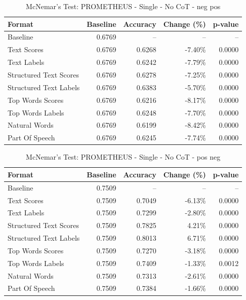\begin{table}[htbp]
\centering
\caption{McNemar's Test: PROMETHEUS - Single - No CoT - neg pos}
\label{tab:prometheus-single-no_chain_of_thought-neg_pos}
\begin{tabular}{lrrrr}
\toprule
Format & Baseline & Accuracy & Change (\%) & p-value \\
\midrule
Baseline & 0.6769 & -- & -- & -- \\
Text Scores & 0.6769 & 0.6268 & -7.40\% & 0.0000 \\
Text Labels & 0.6769 & 0.6242 & -7.79\% & 0.0000 \\
Structured Text Scores & 0.6769 & 0.6278 & -7.25\% & 0.0000 \\
Structured Text Labels & 0.6769 & 0.6383 & -5.70\% & 0.0000 \\
Top Words Scores & 0.6769 & 0.6216 & -8.17\% & 0.0000 \\
Top Words Labels & 0.6769 & 0.6248 & -7.70\% & 0.0000 \\
Natural Words & 0.6769 & 0.6199 & -8.42\% & 0.0000 \\
Part Of Speech & 0.6769 & 0.6245 & -7.74\% & 0.0000 \\
\bottomrule
\end{tabular}
\end{table}

\begin{table}[htbp]
\centering
\caption{McNemar's Test: PROMETHEUS - Single - No CoT - pos neg}
\label{tab:prometheus-single-no_chain_of_thought-pos_neg}
\begin{tabular}{lrrrr}
\toprule
Format & Baseline & Accuracy & Change (\%) & p-value \\
\midrule
Baseline & 0.7509 & -- & -- & -- \\
Text Scores & 0.7509 & 0.7049 & -6.13\% & 0.0000 \\
Text Labels & 0.7509 & 0.7299 & -2.80\% & 0.0000 \\
Structured Text Scores & 0.7509 & 0.7825 & 4.21\% & 0.0000 \\
Structured Text Labels & 0.7509 & 0.8013 & 6.71\% & 0.0000 \\
Top Words Scores & 0.7509 & 0.7270 & -3.18\% & 0.0000 \\
Top Words Labels & 0.7509 & 0.7409 & -1.33\% & 0.0012 \\
Natural Words & 0.7509 & 0.7313 & -2.61\% & 0.0000 \\
Part Of Speech & 0.7509 & 0.7384 & -1.66\% & 0.0000 \\
\bottomrule
\end{tabular}
\end{table}

